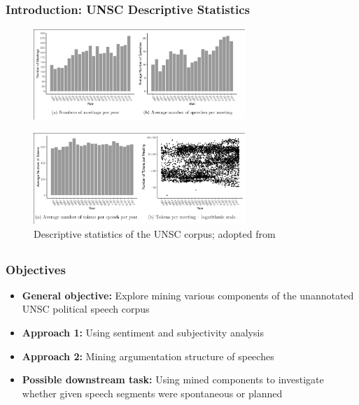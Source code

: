 \documentclass{beamer}
\begin{document}
	\subsection{}
	\begin{framefont}{\footnotesize}
		\begin{frame}
		\vspace{5pt}
			\frametitle{Introduction: UNSC Descriptive Statistics}
			\begin{figure}
					\captionsetup{justification=centering}
					\includegraphics[trim={0.2cm 0cm 0cm 0.2cm},clip,width=8cm]{unsc_speeches_stats_1.png}
			\end{figure}
			\vspace{-5pt}
			\begin{figure}
					\captionsetup{justification=centering}
					\includegraphics[trim={0.3cm 0cm 0cm 0.2cm},clip,width=8cm]{unsc_speeches_stats_2.png}
					\caption{Descriptive statistics of the UNSC corpus; adopted from \citet{schnfeld2019security}}
			\end{figure}
		\end{frame}
	\end{framefont}

	\subsection{}
	\begin{framefont}{\footnotesize}
		\begin{frame}
			\frametitle{Objectives}
			\begin{itemize}
				\setlength\itemsep{1.5em}
				\item \textbf{General objective:} Explore mining various components of the unannotated UNSC political speech corpus
				\item \textbf{Approach 1:} Using sentiment and subjectivity analysis
				\item \textbf{Approach 2:} Mining argumentation structure of speeches
				\item \textbf{Possible downstream task:} Using mined components to investigate whether given speech segments were spontaneous or planned
			\end{itemize}
		\end{frame}
	\end{framefont}
\end{document}
